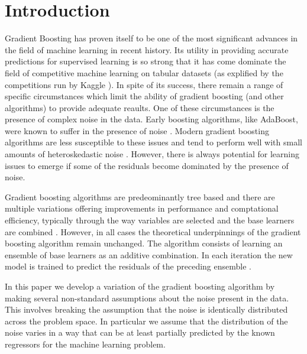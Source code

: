 \documentclass[graybox]{svmult}
\begin{document}
\section{Introduction}

Gradient Boosting has proven itself to be one of the most significant advances in
the field of machine learning in recent history. Its utility in providing accurate predictions
for supervised learning is so strong that it has come dominate the field of competitive machine 
learning on tabular datasets (as explified by the competitions run by Kaggle \cite{kaggle}).
In spite of its success, there remain a range of specific circumstances which limit the ability of
gradient boosting (and other algorithms) to provide adequate reaults. One of these
circumstances is the presence of complex noise in the data.
Early boosting algorithms, like AdaBoost, were known
to suffer in the presence of noise \cite{Freund2001,Schapire2003}. Modern gradient boosting
algorithms are less susceptible to these issues and tend to perform well with small amounts of
heteroskedastic noise \cite{brophy2022}. However, there is always potential for learning issues
to emerge if some of the residuals become dominated by the presence of noise.

Gradient boosting algorithms are predeominantly tree based and there are multiple variations 
offering improvements in performance and comptational efficiency, typically through the way variables
are selected and the base learners are combined \cite{Ke2017}.
However, in all cases the theoretical underpinnings of the gradient boosting algorithm
remain unchanged. The algorithm consists of learning an ensemble of base learners
as an additive combination. In each iteration the new model is trained to predict the
residuals of the preceding ensemble \cite{Friedman2000,Friedman2001,Friedman2002}. 

In this paper we develop a variation of the gradient boosting algorithm by making
several non-standard assumptions about the noise present in the data.
This involves breaking the assumption that the noise is identically distributed across the
problem space. In particular we assume that the distribution of the noise varies in a way that
can be at least partially predicted by the known regressors for the machine learning problem.
\end{document}
